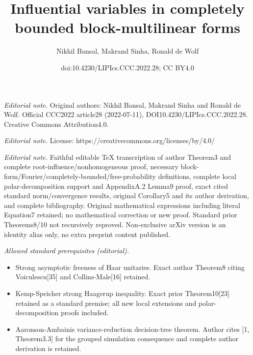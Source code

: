\documentclass[10pt,a4paper]{article}
\title{Influential variables in completely bounded block-multilinear forms}
\author{Nikhil Bansal, Makrand Sinha, Ronald de Wolf}
\date{doi:10.4230/LIPIcs.CCC.2022.28; CC BY4.0}
\begin{document}
\maketitle
\noindent\textit{Editorial note.} Original authors: Nikhil Bansal, Makrand Sinha and Ronald de Wolf. Official CCC2022 article28 (2022-07-11), DOI10.4230/LIPIcs.CCC.2022.28. Creative Commons Attribution4.0.\par\medskip
\noindent\textit{Editorial note.} License: https://creativecommons.org/licenses/by/4.0/\par\medskip
\noindent\textit{Editorial note.} Faithful editable TeX transcription of author Theorem3 and complete root-influence/nonhomogeneous proof, necessary block-form/Fourier/completely-bounded/free-probability definitions, complete local polar-decomposition support and AppendixA.2 Lemma9 proof, exact cited standard norm/convergence results, original Corollary5 and its author derivation, and complete bibliography. Original mathematical expressions including literal Equation7 retained; no mathematical correction or new proof. Standard prior Theorems8/10 not recursively reproved. Non-exclusive arXiv version is an identity alias only, no extra preprint content published.\par\medskip
\noindent\textit{Allowed standard prerequisites (editorial).}\begin{itemize}
\item Strong asymptotic freeness of Haar unitaries. Exact author Theorem8 citing Voiculescu[35] and Collins-Male[16] retained.
\item Kemp-Speicher strong Haagerup inequality. Exact prior Theorem10[23] retained as a standard premise; all new local extensions and polar-decomposition proofs included.
\item Aaronson-Ambainis variance-reduction decision-tree theorem. Author cites [1, Theorem3.3] for the grouped simulation consequence and complete author derivation is retained.
\end{itemize}\medskip
\end{document}
